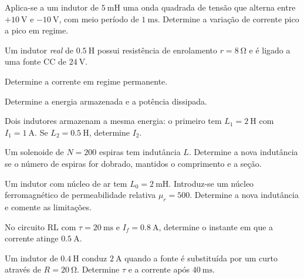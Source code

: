 \begin{questao}[2]{}

Aplica-se a um indutor de $\SI{5}{\milli\henry}$ uma onda quadrada de tensão
que alterna entre $+\SI{10}{\volt}$ e $-\SI{10}{\volt}$, com meio período de
$\SI{1}{\milli\second}$. Determine a variação de corrente pico a pico em
regime.


\end{questao}
\begin{questao}[2]{}

Um indutor \emph{real} de $\SI{0.5}{\henry}$ possui resistência de enrolamento
$r=\SI{8}{\ohm}$ e é ligado a uma fonte CC de $\SI{24}{\volt}$.
\begin{itensq}
\item Determine a corrente em regime permanente.
\item Determine a energia armazenada e a potência dissipada.
\end{itensq}


\end{questao}
\begin{questao}[2]{}

Dois indutores armazenam a mesma energia: o primeiro tem
$L_1=\SI{2}{\henry}$ com $I_1=\SI{1}{\ampere}$. Se
$L_2=\SI{0.5}{\henry}$, determine $I_2$.


\end{questao}
\begin{questao}[2]{}

Um solenoide de $N=200$ espiras tem indutância $L$. Determine a nova
indutância se o número de espiras for dobrado, mantidos o comprimento e a
seção.


\end{questao}
\begin{questao}[2]{}

Um indutor com núcleo de ar tem $L_0=\SI{2}{\milli\henry}$. Introduz-se um
núcleo ferromagnético de permeabilidade relativa $\mu_r=500$. Determine a nova
indutância e comente as limitações.


\end{questao}
\begin{questao}[2]{}

No circuito RL com $\tau=\SI{20}{\milli\second}$ e $I_f=\SI{0.8}{\ampere}$,
determine o instante em que a corrente atinge $\SI{0.5}{\ampere}$.


\end{questao}
\begin{questao}[2]{}

Um indutor de $\SI{0.4}{\henry}$ conduz $\SI{2}{\ampere}$ quando a fonte é
substituída por um curto através de $R=\SI{20}{\ohm}$. Determine $\tau$ e a
corrente após $\SI{40}{\milli\second}$.


\end{questao}

